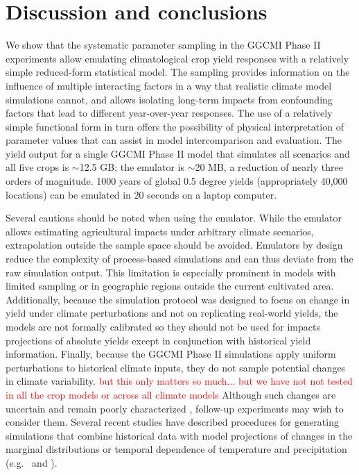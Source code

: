\documentclass[gmd, manuscript]{copernicus} %
\begin{document}
\section{Discussion and conclusions} 
\label{S:6}
We show that the systematic parameter sampling in the GGCMI Phase II experiments allow emulating climatological crop yield responses with a relatively simple reduced-form statistical model. 
The sampling provides information on the influence of multiple interacting factors in a way that realistic climate model simulations cannot, and allows isolating long-term impacts from confounding factors that lead to different year-over-year responses. 
The use of a relatively simple functional form in turn offers the possibility of physical interpretation of parameter values that can assist in model intercomparison and evaluation. 
The yield output for a single GGCMI Phase II model that simulates all scenarios and all five crops is $\sim$12.5 GB; the emulator is $\sim$20 MB, a reduction of nearly three orders of magnitude.
1000 years of global 0.5 degree yields (appropriately 40,000 locations) can be emulated in 20 seconds on a laptop computer. 

Several cautions should be noted when using the emulator. 
While the emulator allows estimating agricultural impacts under arbitrary climate scenarios, extrapolation outside the sample space should be avoided. 
Emulators by design reduce the complexity of process-based simulations and can thus deviate from the raw simulation output. 
This limitation is especially prominent in models with limited sampling or in geographic regions outside the current cultivated area.
Additionally, because the simulation protocol was designed to focus on change in yield under climate perturbations and not on replicating real-world yields, the models are not formally calibrated so they should not be used for impacts projections of absolute yields except in conjunction with historical yield information. 
Finally, because the GGCMI Phase II simulations apply uniform perturbations to historical climate inputs, they do not sample potential changes in climate variability. \textcolor{red}{but this only matters so much... but we have not not tested in all the crop models or across all climate models}
Although such changes are uncertain and remain poorly characterized \citep[e.g.][]{Alexande2006, Kodra2014}, follow-up experiments may wish to consider them. 
Several recent studies have described procedures for generating simulations that combine historical data with model projections of changes in the marginal distributions or temporal dependence of temperature and precipitation (e.g.\ \citet{Leeds2015, poppick2016, Won16} and \citet{Haugen2018}).
\end{document}
